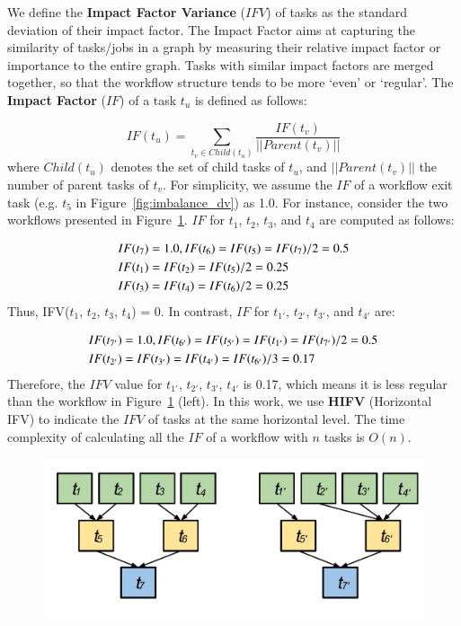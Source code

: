 We define the \textbf{Impact Factor Variance} ($IFV$) of tasks as the standard deviation of their impact factor. The Impact Factor aims at capturing the similarity of tasks/jobs in a graph by measuring their relative impact factor or importance to the entire graph. Tasks with similar impact factors are merged together, so that the workflow structure tends to be more `even' or `regular'. The \textbf{Impact Factor} ($IF$) of a task $t_u$ is defined as follows:

\begin{equation}
\label{eq:imbalance_impact_factor}
	IF(t_u)=\sum_{t_v\in Child(t_u)}^{}\frac{IF(t_v)}{||Parent(t_v)||}
\end{equation}
where $Child(t_u)$ denotes the set of child tasks of $t_u$, and $||Parent(t_v)||$ the number of parent tasks of $t_v$. For simplicity, we assume the $IF$ of a workflow exit task (e.g. $t_5$ in Figure~\ref{fig:imbalance_dv}) as 1.0. For instance, consider the two workflows presented in Figure~\ref{fig:imbalance_hifv}. $IF$ for $t_1$, $t_2$, $t_3$, and $t_4$ are computed as follows:

\begin{eqnarray}
	\displaystyle  
	&IF(t_7 )=1.0, IF(t_6 )=IF(t_5 )=IF(t_7 )/2=0.5\nonumber  \\
	&IF(t_1 )=IF(t_2 )=IF(t_5 )/2=0.25\nonumber \\
	&IF(t_3 )=IF(t_4 )=IF(t_6 )/2=0.25\nonumber 
\end{eqnarray}
Thus, IFV($t_1$, $t_2$, $t_3$, $t_4$) = 0. In contrast, $IF$ for $t_{1'}$, $t_{2'}$, $t_{3'}$, and $t_{4'}$ are:

\begin{eqnarray}
	\displaystyle  
	&IF(t_{7'})=1.0, IF(t_{6'})=IF(t_{5'})=IF(t_{1'})=IF(t_{7'})/2=0.5\nonumber \\
	&IF(t_{2'})=IF(t_{3'})=IF(t_{4'})=IF(t_{6'})/3=0.17 \nonumber
\end{eqnarray}
Therefore, the $IFV$ value for {$t_{1'}$, $t_{2'}$, $t_{3'}$, $t_{4'}$} is 0.17, which means it is less regular than the workflow in Figure~\ref{fig:imbalance_hifv} (left). In this work, we use \textbf{HIFV} (Horizontal IFV) to indicate the $IFV$ of tasks at the same horizontal level. The time complexity of calculating all the $IF$ of a workflow with $n$ tasks is $O(n)$.  

\begin{figure}[htb]
	\centering
	\includegraphics[width=0.85\linewidth]{figures/imbalance/dependency.pdf}
	\label{fig:imbalance_hifv}
\end{figure}

